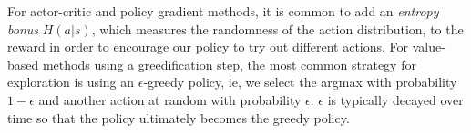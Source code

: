 For actor-critic and policy gradient methods, it is common to add an \emph{entropy bonus} $H(a|s)$, which measures the randomness of the action distribution, to the reward in order to encourage our policy to try out different actions. For value-based methods using a greedification step, the most common strategy for exploration is using an $\epsilon$-greedy policy, ie, we select the argmax with probability $1-\epsilon$ and another action at random with probability $\epsilon$. $\epsilon$ is typically decayed over time so that the policy ultimately becomes the greedy policy.




 
















































